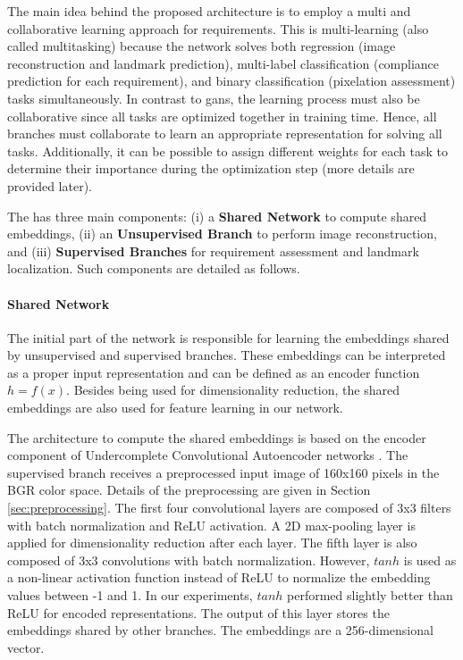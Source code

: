 The main idea behind the proposed architecture is to employ a multi and collaborative learning approach for \icao requirements. This is multi-learning (also called multitasking) because the network solves both regression (image reconstruction and landmark prediction), multi-label classification (compliance prediction for each requirement), and binary classification (pixelation assessment) tasks simultaneously. In contrast to \acfp{gan}, the learning process must also be collaborative since all tasks are optimized together in training time. Hence, all branches must collaborate to learn an appropriate representation for solving all tasks. Additionally, it can be possible to assign different weights for each task to determine their importance during the optimization step (more details are provided later).
 
The \methodname has three main components: (i) a \textbf{Shared Network} to compute shared embeddings, (ii) an \textbf{Unsupervised Branch} to perform image reconstruction, and (iii) \textbf{Supervised Branches} for requirement assessment and landmark localization. Such components are detailed as follows.
 
\paragraph{Shared Network}
 
The initial part of the network is responsible for learning the embeddings shared by unsupervised and supervised branches. These embeddings can be interpreted as a proper input representation and can be defined as an encoder function $h = f(x)$. Besides being used for dimensionality reduction, the shared embeddings are also used for feature learning in our network.
 
The architecture to compute the shared embeddings is based on the encoder component of Undercomplete Convolutional Autoencoder networks \citep[p.~500]{goodfellow2016deep}. The supervised branch receives a preprocessed input image of 160x160 pixels in the BGR color space. Details of the preprocessing are given in Section \ref{sec:preprocessing}. The first four convolutional layers are composed of 3x3 filters with batch normalization and ReLU activation. A 2D max-pooling layer is applied for dimensionality reduction after each layer. The fifth layer is also composed of 3x3 convolutions with batch normalization. However, $tanh$ is used as a non-linear activation function instead of ReLU to normalize the embedding values between -1 and 1. In our experiments, $tanh$ performed slightly better than ReLU for encoded representations. The output of this layer stores the embeddings shared by other branches. The embeddings are a 256-dimensional vector.
 
